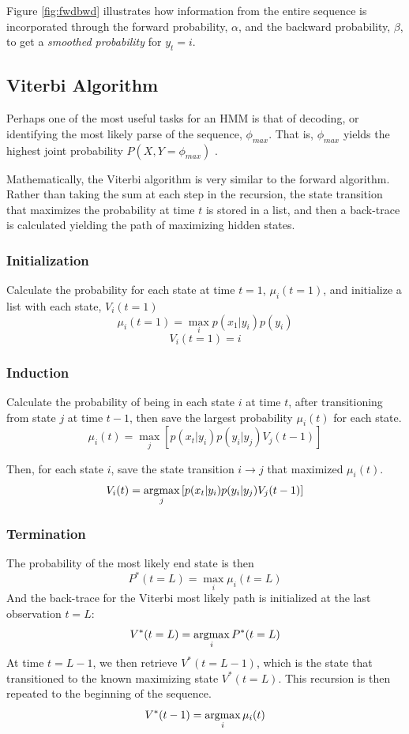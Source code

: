 Figure \ref{fig:fwdbwd} illustrates how information from the entire sequence is incorporated through the forward probability, $\alpha$, and the backward probability, $\beta$, to get a \emph{smoothed probability} for $y_t = i$.

\subsection{Viterbi Algorithm}
Perhaps one of the most useful tasks for an HMM is that of decoding, or identifying the most likely parse of the sequence, $\phi_{max}$. That is, $\phi_{max}$ yields the highest joint probability $P(X,Y=\phi_{max})$ \cite{Rabiner1989ARecognition}. 

Mathematically, the Viterbi algorithm is very similar to the forward algorithm. Rather than taking the sum at each step in the recursion, the state transition that maximizes the probability at time $t$ is stored in a list, and then a back-trace is calculated yielding the path of maximizing hidden states.

\subsubsection{Initialization}
Calculate the probability for each state at time $t=1$, $\mu_i(t=1)$, and initialize a list with each state, $V_i(t=1)$
\begin{equation}
    \mu_i(t=1) = \max_i p(x_1|y_i)p(y_i)
\label{eq:fwdinit}
\end{equation}
$$    V_i(t=1) = i$$
\subsubsection{Induction}
Calculate the probability of being in each state $i$ at time $t$, after transitioning from state $j$ at time $t-1$, then save the largest probability $\mu_i(t)$ for each state. 
\begin{equation}
    \mu_i(t) =\max_j\left[p(x_t|y_i)p(y_i|y_j)V_j(t-1)\right]
\label{eq:fwdinduc}
\end{equation}

Then, for each state $i$, save the state transition $i\rightarrow j$ that maximized $\mu_i(t)$.  
$$V_i(t) =\operatorname*{argmax}_j\left[p(x_t|y_i)p(y_i|y_j)V_j(t-1)\right]$$

\subsubsection{Termination}
The probability of the most likely end state is then
\begin{equation}
    P^*(t=L) = \max_i{\mu_i(t=L)}
\label{eq:fwdterm}
\end{equation}
And the back-trace for the Viterbi most likely path is initialized at the last observation $t=L$:
$$V^*(t=L) = \operatorname*{argmax}_i{P^*(t=L)}$$
At time $t=L-1$, we then retrieve $V^*(t=L-1)$, which is the state that transitioned to the known maximizing state $V^*(t=L)$. This recursion is then repeated to the beginning of the sequence.
\begin{equation}
V^*(t-1) = \operatorname*{argmax}_i{\mu_i(t)}
\label{eq:backtrace}    
\end{equation}

